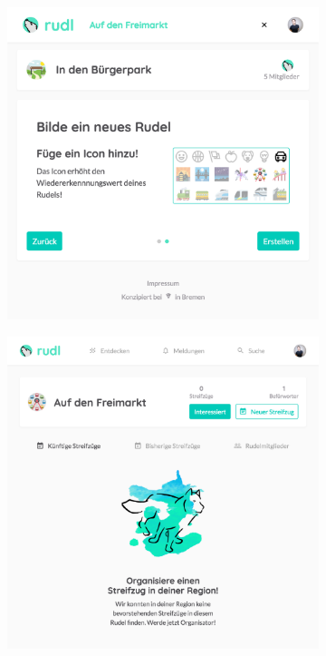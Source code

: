 \documentclass[12pt,numbers=noenddot,parskip,bibliography=totocnumbered,listof=totocnumbered,draft]{scrreprt}
\begin{document}
\begin{figure}
\bigskip

\begin{subfigure}[t]{0.45\textwidth}%
\centering
\includegraphics[width=\linewidth]{createinterestgroup1.png}
\caption{}
\label{createinterestgroup1}
\end{subfigure}%
\hfill
\begin{subfigure}[t]{0.45\textwidth}%
\centering
\includegraphics[width=\linewidth]{interestgroup.png}

\end{subfigure}
\end{figure}
\end{document}
